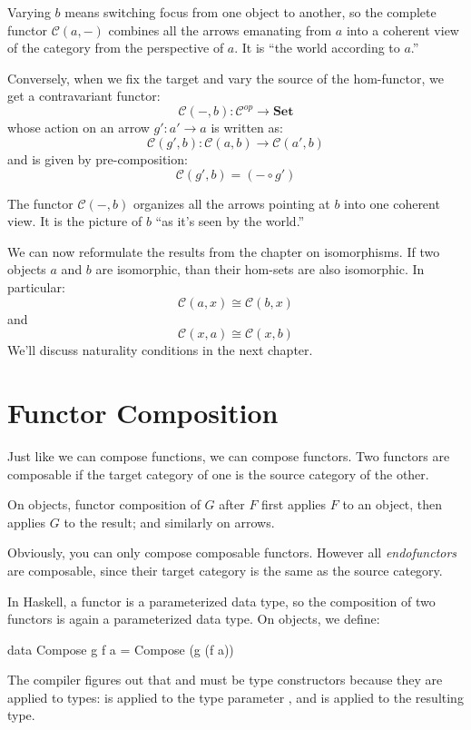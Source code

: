 \documentclass[DaoFP]{subfiles}
\begin{document}
Varying $b$ means switching focus from one object to another, so the complete functor $\mathcal{C}(a, -)$ combines all the arrows emanating from $a$ into a coherent view of the category from the perspective of $a$. It is ``the world according to $a$.''

Conversely, when we fix the target and vary the source of the hom-functor, we get a contravariant functor:
\[ \mathcal{C}(-, b) \colon \mathcal{C}^{op} \to \mathbf{Set} \]
whose action on an arrow $g' \colon a' \to a$ is written as:
\[ \mathcal{C}(g', b) \colon \mathcal{C}(a, b) \to \mathcal{C}(a', b) \]
and is given by pre-composition:
\[\mathcal{C}(g', b) = (- \circ g') \]

The functor $\mathcal{C}(-, b)$ organizes all the arrows pointing at $b$ into one coherent view. It is the picture of $b$ ``as it's seen by the world.''

We can now reformulate the results from the chapter on isomorphisms. If two objects $a$ and $b$ are isomorphic, than their hom-sets are also isomorphic. In particular:
\[\mathcal{C}(a, x) \cong \mathcal{C}(b, x)\]
and 
\[\mathcal{C}(x, a) \cong \mathcal{C}(x, b)\]
We'll discuss naturality conditions in the next chapter.


\section{Functor Composition}

Just like we can compose functions, we can compose functors. Two functors are composable if the target category of one is the source category of the other.

 On objects, functor composition of $G$ after $F$ first applies $F$ to an object, then applies $G$ to the result; and similarly on arrows.
 
 Obviously, you can only compose composable functors. However all \emph{endofunctors} are composable, since their target category is the same as the source category.
 
 In Haskell, a functor is a parameterized data type, so the composition of two functors is again a parameterized data type. On objects, we define:
 \begin{haskell}
data Compose g f a = Compose (g (f a))
\end{haskell}
The compiler figures out that  and  must be type constructors because they are applied to types:  is applied to the type parameter , and  is applied to the resulting type.
\end{document}
